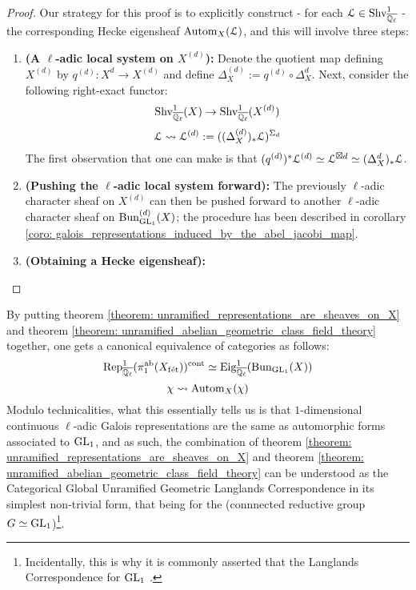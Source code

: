             \begin{proof}
                Our strategy for this proof is to explicitly construct - for each $\mathcal{L} \in \mathrm{Shv}^1_{\overline{\mathbb{Q}_{\ell}}}$ - the corresponding Hecke eigensheaf $\mathrm{Autom}_X(\mathcal{L})$, and this will involve three steps:
                    \begin{enumerate}
                        \item \textbf{(A $\ell$-adic local system on $X^{(d)}$):} Denote the quotient map defining $X^{(d)}$ by $q^{(d)}: X^d \to X^{(d)}$ and define $\Delta_X^{(d)} := q^{(d)} \circ \Delta_X^d$. Next, consider the following right-exact functor:
                            $$\mathrm{Shv}^1_{\overline{\mathbb{Q}_{\ell}}}(X) \to \mathrm{Shv}^1_{\overline{\mathbb{Q}_{\ell}}}(X^{(d)})$$
                            $$\mathcal{L} \leadsto \mathcal{L}^{(d)} := ((\Delta_X^{(d)})_*\mathcal{L})^{\Sigma_d}$$
                        The first observation that one can make is that $(q^{(d)})^*\mathcal{L}^{(d)} \simeq \mathcal{L}^{\boxtimes d} \simeq (\Delta_X^d)_*\mathcal{L}$.
                        \item \textbf{(Pushing the $\ell$-adic local system forward):} The previously $\ell$-adic character sheaf on $X^{(d)}$ can then be pushed forward to another $\ell$-adic character sheaf on $\mathrm{Bun}_{\operatorname{GL}_1}^{(d)}(X)$; the procedure has been described in corollary \ref{coro: galois_representations_induced_by_the_abel_jacobi_map}.
                        \item \textbf{(Obtaining a Hecke eigensheaf):}
                    \end{enumerate}
            \end{proof}
        \begin{remark} \label{remark: unramified_abelian_geometric_class_field_theory_explanation}
            By putting theorem \ref{theorem: unramified_representations_are_sheaves_on_X} and theorem \ref{theorem: unramified_abelian_geometric_class_field_theory} together, one gets a canonical equivalence of categories as follows:
                $$\mathrm{Rep}_{\overline{\mathbb{Q}_{\ell}}}^1(\pi_1^{\mathrm{ab}}(X_{\mathrm{f\acute{e}t}}))^{\mathrm{cont}} \simeq \mathrm{Eig}^1_{\overline{\mathbb{Q}_{\ell}}}(\mathrm{Bun}_{\operatorname{GL}_1}(X))$$
                $$\chi \leadsto \mathrm{Autom}_X(\chi)$$
            Modulo technicalities, what this essentially tells us is that $1$-dimensional continuous $\ell$-adic Galois representations are the same as automorphic forms associated to $\operatorname{GL}_1$, and as such, the combination of theorem \ref{theorem: unramified_representations_are_sheaves_on_X} and theorem \ref{theorem: unramified_abelian_geometric_class_field_theory} can be understood as the Categorical Global Unramified Geometric Langlands Correspondence in its simplest non-trivial form, that being for the (connnected reductive group $G \simeq \operatorname{GL}_1$)\footnote{Incidentally, this is why it is commonly asserted that the Langlands Correspondence for $\operatorname{GL}_1$ .}. 
        \end{remark}
        
